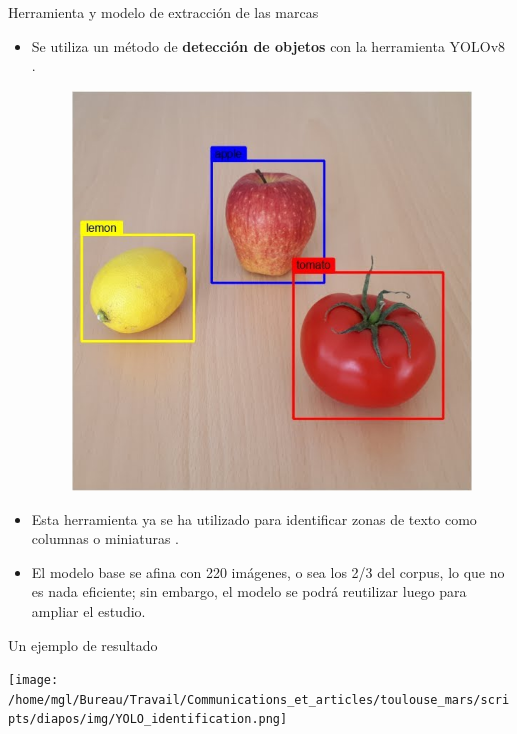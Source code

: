 \documentclass[11pt,aspectratio=169]{beamer}
\begin{document}
\begin{frame}{Herramienta y modelo de extracción de las marcas}
\begin{itemize}
\item Se utiliza un método de \textbf{detección de objetos} con la herramienta YOLOv8 \parencite{redmon_YouOnlyLook_2016}. 
\begin{figure}
\begin{center}
\includegraphics[height=.4\textheight]{img/yolo_detection.png}
\end{center}
\end{figure}
\item Esta herramienta ya se ha utilizado para identificar zonas de texto como columnas o miniaturas \parencite{clerice_YouActuallyLook_2022}.
\item El modelo base se afina con 220 imágenes, o sea los 2/3 del corpus, lo que no es nada eficiente; sin embargo, el modelo se podrá reutilizar luego para ampliar el estudio.
\end{itemize}
\end{frame}


\begin{frame}{Un ejemplo de resultado}
\begin{center}
\texttt{[image: /home/mgl/Bureau/Travail/Communications\_et\_articles/toulouse\_mars/scripts/diapos/img/YOLO\_identification.png]}
\end{center}
\end{frame}
\end{document}
